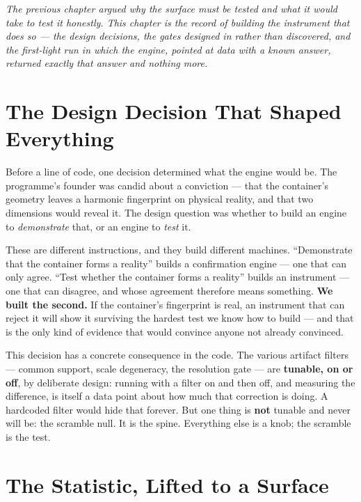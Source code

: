 \documentclass[11pt, letterpaper, openany]{book}
\begin{document}
\begin{center}
\textit{The previous chapter argued why the surface must be tested and what it would take to test
it honestly. This chapter is the record of building the instrument that does so --- the design
decisions, the gates designed in rather than discovered, and the first-light run in which the
engine, pointed at data with a known answer, returned exactly that answer and nothing more.}
\end{center}

\section{The Design Decision That Shaped Everything}

Before a line of code, one decision determined what the engine would be. The programme's founder
was candid about a conviction --- that the container's geometry leaves a harmonic fingerprint on
physical reality, and that two dimensions would reveal it. The design question was whether to build
an engine to \emph{demonstrate} that, or an engine to \emph{test} it.

\begin{signalbox}
These are different instructions, and they build different machines. ``Demonstrate that the
container forms a reality'' builds a confirmation engine --- one that can only agree. ``Test whether
the container forms a reality'' builds an instrument --- one that can disagree, and whose agreement
therefore means something. \textbf{We built the second.} If the container's fingerprint is real, an
instrument that can reject it will show it surviving the hardest test we know how to build --- and
that is the only kind of evidence that would convince anyone not already convinced.
\end{signalbox}

This decision has a concrete consequence in the code. The various artifact filters --- common
support, scale degeneracy, the resolution gate --- are \textbf{tunable, on or off}, by deliberate
design: running with a filter on and then off, and measuring the difference, is itself a data point
about how much that correction is doing. A hardcoded filter would hide that forever. But one thing
is \textbf{not} tunable and never will be: the scramble null. It is the spine. Everything else is a
knob; the scramble is the test.

\section{The Statistic, Lifted to a Surface}
\end{document}

